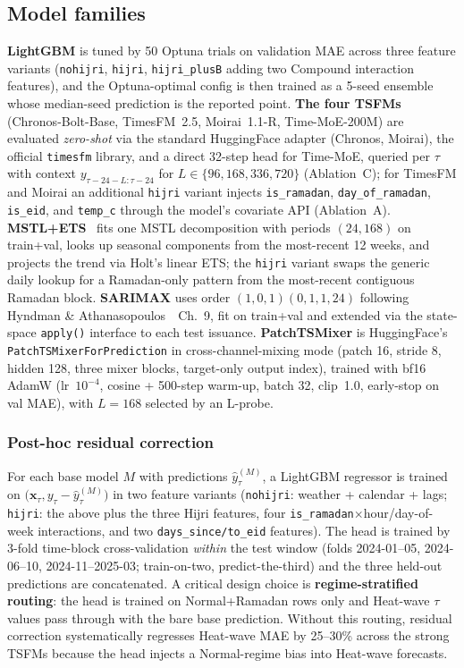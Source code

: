 \documentclass[10pt, a4paper, twocolumn]{article}
\begin{document}
\subsection{Model families}

\textbf{LightGBM} is tuned by 50 Optuna trials on validation MAE
across three feature variants (\texttt{nohijri},
\texttt{hijri}, \texttt{hijri\_plusB} adding two Compound
interaction features), and the Optuna-optimal config is then
trained as a 5-seed ensemble whose median-seed prediction is the
reported point. \textbf{The four TSFMs} (Chronos-Bolt-Base,
TimesFM~2.5, Moirai~1.1-R, Time-MoE-200M) are evaluated
\emph{zero-shot} via the standard HuggingFace adapter (Chronos,
Moirai), the official \texttt{timesfm} library, and a direct
32-step head for Time-MoE, queried per $\tau$ with context
$y_{\tau-24-L:\tau-24}$ for $L \in \{96, 168, 336, 720\}$
(Ablation~C); for TimesFM and Moirai an additional
\texttt{hijri} variant injects \texttt{is\_ramadan},
\texttt{day\_of\_ramadan}, \texttt{is\_eid}, and \texttt{temp\_c}
through the model's covariate API (Ablation~A).
\textbf{MSTL+ETS}~\cite{bandara2021mstl, hyndman2008ets} fits one
MSTL decomposition with periods $(24, 168)$ on train+val, looks
up seasonal components from the most-recent 12 weeks, and
projects the trend via Holt's linear ETS; the \texttt{hijri}
variant swaps the generic daily lookup for a Ramadan-only
pattern from the most-recent contiguous Ramadan block.
\textbf{SARIMAX} uses order $(1, 0, 1)(0, 1, 1, 24)$ following
Hyndman \& Athanasopoulos~\cite{hyndman2021fpp3}~Ch.~9, fit on
train+val and extended via the state-space \texttt{apply()}
interface to each test issuance. \textbf{PatchTSMixer} is
HuggingFace's \texttt{PatchTSMixerForPrediction} in
cross-channel-mixing mode (patch 16, stride 8, hidden 128, three
mixer blocks, target-only output index), trained with bf16
AdamW (lr~$10^{-4}$, cosine + 500-step warm-up, batch 32,
clip~1.0, early-stop on val MAE), with $L = 168$ selected by an
L-probe.

\subsubsection{Post-hoc residual correction}
\label{sec:methodology:residual}

For each base model $M$ with predictions $\hat{y}^{(M)}_\tau$, a
LightGBM regressor is trained on
$\bigl(\mathbf{x}_\tau, y_\tau - \hat{y}^{(M)}_\tau\bigr)$ in two
feature variants (\texttt{nohijri}: weather + calendar + lags;
\texttt{hijri}: the above plus the three Hijri features, four
\texttt{is\_ramadan}$\times$hour/day-of-week interactions, and
two \texttt{days\_since/to\_eid} features). The head is trained
by 3-fold time-block cross-validation \emph{within} the test
window (folds 2024-01--05, 2024-06--10, 2024-11--2025-03;
train-on-two, predict-the-third) and the three held-out
predictions are concatenated. A critical design choice is
\textbf{regime-stratified routing}: the head is trained on
Normal+Ramadan rows only and Heat-wave $\tau$ values pass through
with the bare base prediction. Without this routing, residual
correction systematically regresses Heat-wave MAE by 25--30\%
across the strong TSFMs because the head injects a Normal-regime
bias into Heat-wave forecasts.
\end{document}
